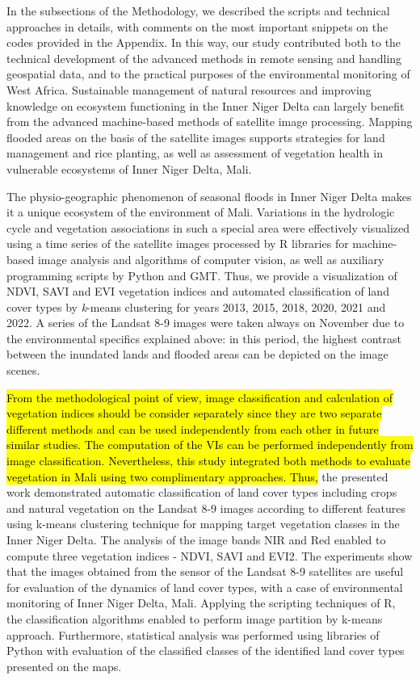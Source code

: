 \documentclass[12pt,a4paper,oneside]{article}
\def \newpar{\vspace{6pt}}
\begin{document}
\newpar In the subsections of the Methodology, we described the scripts and technical approaches in details, with comments on the most important snippets on the codes provided in the Appendix. In this way, our study contributed both to the technical development of the advanced methods in remote sensing and handling geospatial data, and to the practical purposes of the environmental monitoring of West Africa. Sustainable management of natural resources and improving knowledge on ecosystem functioning in the Inner Niger Delta can largely benefit from the advanced machine-based methods of satellite image processing. Mapping flooded areas on the basis of the satellite images supports strategies for land management and rice planting, as well as assessment of vegetation health in vulnerable ecosystems of Inner Niger Delta, Mali. 

\newpar The physio-geographic phenomenon of seasonal floods in Inner Niger Delta makes it a unique ecosystem of the environment of Mali. Variations in the hydrologic cycle and vegetation associations in such a special area were effectively visualized using a time series of the satellite images processed by R libraries for machine-based image analysis and algorithms of computer vision, as well as auxiliary programming scripts by Python and GMT. Thus, we provide a visualization of NDVI, SAVI and EVI vegetation indices and automated classification of land cover types by \emph{k}-means clustering for years 2013, 2015, 2018, 2020, 2021 and 2022. A series of the Landsat 8-9 images were taken always on November due to the environmental specifics explained above: in this period, the highest contrast between the inundated lands and flooded areas can be depicted on the image scenes. 

\newpar \hl{From the methodological point of view, image classification and calculation of vegetation indices should be consider separately since they are two separate different methods and can be used independently from each other in future similar studies. The computation of the VIs can be performed independently from image classification. Nevertheless, this study integrated both methods to evaluate vegetation in Mali using two complimentary approaches. Thus, }the presented work demonstrated automatic classification of land cover types including crops and natural vegetation on the Landsat 8-9 images according to different features using k-means clustering technique for mapping target vegetation classes in the Inner Niger Delta. The analysis of the image bands NIR and Red enabled to compute three vegetation indices - NDVI, SAVI and EVI2. The experiments show that the images obtained from the sensor of the Landsat 8-9 satellites are useful for evaluation of the dynamics of land cover types, with a case of environmental monitoring of Inner Niger Delta, Mali. Applying the scripting techniques of R, the classification algorithms enabled to perform image partition by k-means approach. Furthermore, statistical analysis was performed using libraries of Python with evaluation of the classified classes of the identified land cover types presented on the maps.
\end{document}
